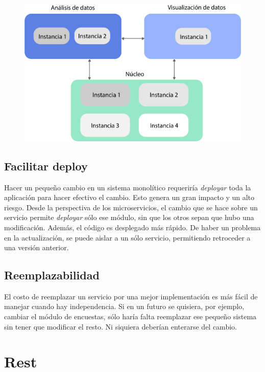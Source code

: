 \begin{figure}[h!]
  \centering
    \includegraphics[scale=0.7]{images/escalamiento.png}
  \label{fig:microescala}
\end{figure}

\subsection[Facilitar deploy]{Facilitar deploy}

Hacer un pequeño cambio en un sistema monolítico requeriría \textit{deployar} toda la aplicación para hacer efectivo el cambio. Esto genera un gran impacto y un alto riesgo. 
Desde la perspectiva de los microservicios, el cambio que se hace sobre un servicio permite \textit{deployar} sólo ese módulo, sin que los otros sepan que hubo una modificación. Además, el código es desplegado más rápido. 
De haber un problema en la actualización, se puede aislar a un sólo servicio, permitiendo retroceder a una versión anterior.

\subsection[Reemplazabilidad]{Reemplazabilidad}

El costo de reemplazar un servicio por una mejor implementación es más fácil de manejar cuando hay independencia. 
Si en un futuro se quisiera, por ejemplo, cambiar el módulo de encuestas, sólo haría falta reemplazar ese pequeño sistema sin tener que modificar el resto. Ni siquiera deberían enterarse del cambio.

\section[REST]{Rest}

